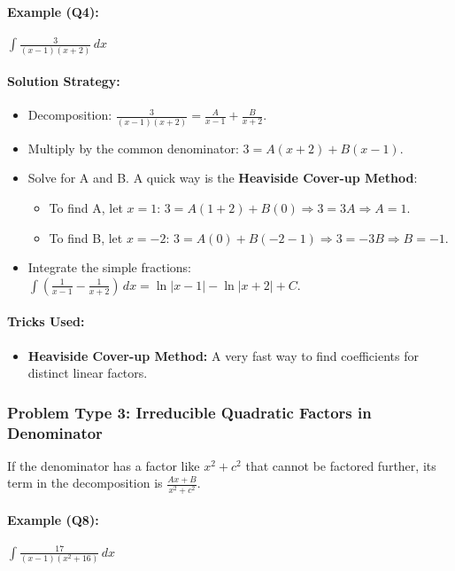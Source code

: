 \documentclass{article}
\begin{document}
\paragraph{Example (Q4):} $ \int \frac{3}{(x-1)(x+2)} \,dx $
\paragraph{Solution Strategy:}
\begin{itemize}
    \item Decomposition: $\frac{3}{(x-1)(x+2)} = \frac{A}{x-1} + \frac{B}{x+2}$.
    \item Multiply by the common denominator: $3 = A(x+2) + B(x-1)$.
    \item Solve for A and B. A quick way is the \textbf{Heaviside Cover-up Method}:
    \begin{itemize}
        \item To find A, let $x=1$: $3 = A(1+2) + B(0) \Rightarrow 3=3A \Rightarrow A=1$.
        \item To find B, let $x=-2$: $3 = A(0) + B(-2-1) \Rightarrow 3=-3B \Rightarrow B=-1$.
    \end{itemize}
    \item Integrate the simple fractions: $\int (\frac{1}{x-1} - \frac{1}{x+2}) \,dx = \ln|x-1| - \ln|x+2| + C$.
\end{itemize}
\paragraph{Tricks Used:}
\begin{itemize}
    \item \textbf{Heaviside Cover-up Method:} A very fast way to find coefficients for distinct linear factors.
\end{itemize}

\subsubsection{Problem Type 3: Irreducible Quadratic Factors in Denominator}
If the denominator has a factor like $x^2+c^2$ that cannot be factored further, its term in the decomposition is $\frac{Ax+B}{x^2+c^2}$.
\paragraph{Example (Q8):} $ \int \frac{17}{(x-1)(x^2+16)} \,dx $
\end{document}
